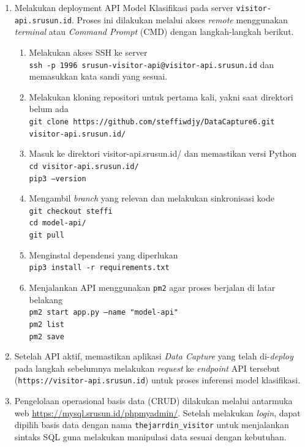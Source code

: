 \begin{enumerate}[label=\alph*.]
    \item Melakukan deployment API Model Klasifikasi pada server \texttt{visitor-api.srusun.id}. Proses ini dilakukan melalui akses \textit{remote} menggunakan \textit{terminal} atau \textit{Command Prompt} (CMD) dengan langkah-langkah berikut.
    \begin{enumerate}
        \item Melakukan akses SSH ke server \\
        \texttt{ssh -p 1996 srusun-visitor-api@visitor-api.srusun.id} dan memasukkan kata sandi yang sesuai.
        \item Melakukan kloning repositori untuk pertama kali, yakni saat direktori belum ada \\
        \texttt{git clone https://github.com/steffiwdjy/DataCapture6.git visitor-api.srusun.id/}
        \item Masuk ke direktori visitor-api.srusun.id/ dan memastikan versi Python \\
        \texttt{cd visitor-api.srusun.id/} \\
        \texttt{pip3 --version}
        \item Mengambil \textit{branch} yang relevan dan melakukan sinkronisasi kode \\
        \texttt{git checkout steffi} \\
        \texttt{cd model-api/} \\
        \texttt{git pull}
        \item Menginstal dependensi yang diperlukan \\
        \texttt{pip3 install -r requirements.txt}
        \item Menjalankan API menggunakan \texttt{pm2} agar proses berjalan di latar belakang \\
        \texttt{pm2 start app.py --name "model-api"} \\
        \texttt{pm2 list} \\
        \texttt{pm2 save}
    \end{enumerate}
    \item Setelah API aktif, memastikan aplikasi \textit{Data Capture} yang telah di-\textit{deploy} pada langkah sebelumnya melakukan \textit{request} ke \textit{endpoint} API tersebut (\texttt{https://visitor-api.srusun.id}) untuk proses inferensi model klasifikasi.




    \item Pengelolaan operasional basis data (CRUD) dilakukan melalui antarmuka web \url{https://mysql.srusun.id/phpmyadmin/}. Setelah melakukan \textit{login}, dapat dipilih basis data dengan nama \texttt{thejarrdin\_visitor} untuk menjalankan sintaks SQL guna melakukan manipulasi data sesuai dengan kebutuhan.
\end{enumerate}



